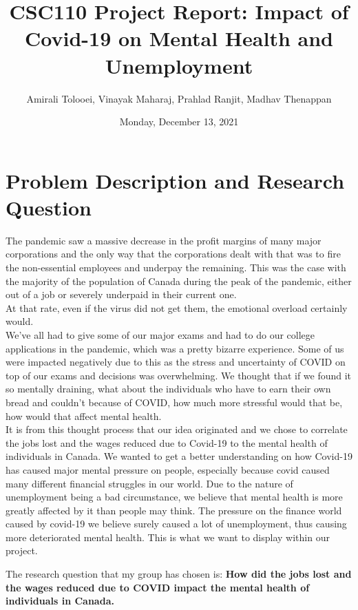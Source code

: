 \documentclass[fontsize=11pt]{article}
\title{CSC110 Project Report: Impact of Covid-19 on Mental Health and Unemployment}
\author{Amirali Tolooei, Vinayak Maharaj, Prahlad Ranjit, Madhav Thenappan}
\date{Monday, December 13, 2021}
\begin{document}
    \maketitle

    \section*{Problem Description and Research Question}

    The pandemic saw a massive decrease in the profit margins of many major corporations and the only way that the corporations dealt with that was to fire the non-essential employees and underpay the remaining. This was the case with the majority of the population of Canada during the peak of the pandemic, either out of a job or severely underpaid in their current one.
    \\
    At that rate, even if the virus did not get them, the emotional overload certainly would.\\

    We've all had to give some of our major exams and had to do our college applications in the pandemic, which was a pretty bizarre experience. Some of us were impacted negatively due to this as the stress and uncertainty of COVID on top of our exams and decisions was overwhelming. We thought that if we found it so mentally draining, what about the individuals who have to earn their own bread and couldn't because of COVID, how much more stressful would that be, how would that affect mental health.\\

    It is from this thought process that our idea originated and we chose to correlate the jobs lost and the wages reduced due to Covid-19 to the mental health of individuals in Canada. We wanted to get a better understanding on how Covid-19 has caused major mental pressure on people, especially because covid caused many different financial struggles in our world. Due to the nature of unemployment being a bad circumstance, we believe that mental health is more greatly affected by it than people may think. The pressure on the finance world caused by covid-19 we believe surely caused a lot of unemployment, thus causing more deteriorated mental health. This is what we want to display within our project.

    The research question that my group has chosen is: \textbf{How did the jobs lost and the wages reduced due to COVID impact the mental health of individuals in Canada.}
\end{document}
